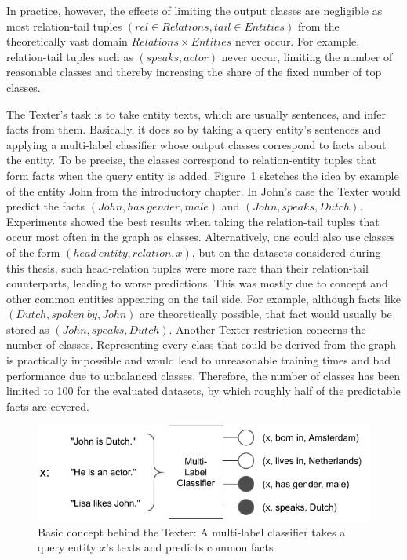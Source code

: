 In practice, however, the effects of limiting the output classes are negligible as most relation-tail tuples $(rel \in Relations, tail \in Entities)$ from the theoretically vast domain $Relations \times Entities$ never occur. For example, relation-tail tuples such as $(speaks, actor)$ never occur, limiting the number of reasonable classes and thereby increasing the share of the fixed number of top classes.

The Texter's task is to take entity texts, which are usually sentences, and infer facts from them. Basically, it does so by taking a query entity's sentences and applying a multi-label classifier whose output classes correspond to facts about the entity. To be precise, the classes correspond to relation-entity tuples that form facts when the query entity is added. Figure~\ref{fig:4_approach/1_texter/texter_idea} sketches the idea by example of the entity John from the introductory chapter. In John's case the Texter would predict the facts $(John, has~gender, male)$ and $(John, speaks, Dutch)$. Experiments showed the best results when taking the relation-tail tuples that occur most often in the graph as classes. Alternatively, one could also use classes of the form $(head~entity, relation, x)$, but on the datasets considered during this thesis, such head-relation tuples were more rare than their relation-tail counterparts, leading to worse predictions. This was mostly due to concept and other common entities appearing on the tail side. For example, although facts like $(Dutch, spoken~by, John)$ are theoretically possible, that fact would usually be stored as $(John, speaks, Dutch)$. Another Texter restriction concerns the number of classes. Representing every class that could be derived from the graph is practically impossible and would lead to unreasonable training times and bad performance due to unbalanced classes. Therefore, the number of classes has been limited to 100 for the evaluated datasets, by which roughly half of the predictable facts are covered.

\begin{figure}[t]
    \centering
    \includegraphics[width=\textwidth]{4_approach/1_texter/texter_idea}
    \caption{Basic concept behind the Texter: A multi-label classifier takes a query entity $x$'s texts and predicts common facts}
    \label{fig:4_approach/1_texter/texter_idea}
\end{figure}


